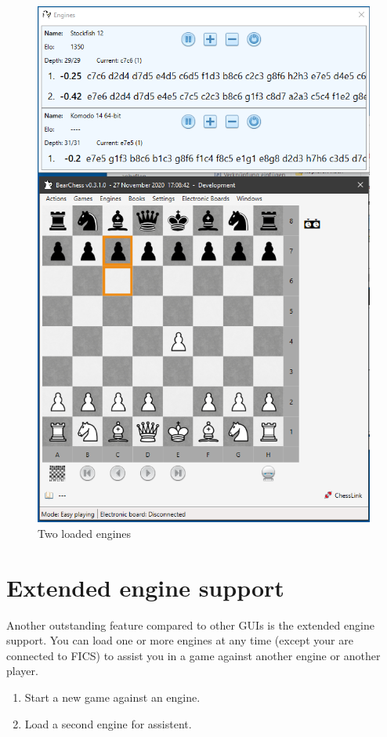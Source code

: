\documentclass[11pt,a4paper]{article}
\begin{document}
\begin{figure}[H]
	\centering
	\includegraphics[scale=0.7]{EngineWindow2.png}
	\caption{Two loaded engines}
	\label{fig:EngineWindow2}
\end{figure}

\section{Extended engine support}  \label{ExtendedSupport}

Another outstanding feature compared to other GUIs is the extended engine support. You can load one or more engines at any time (except your are connected to FICS) to assist you in a game against another engine or another player.
\begin{enumerate}
	\item Start a new game against an engine.
	\item Load a second engine for assistent.
\end{enumerate}
\end{document}
